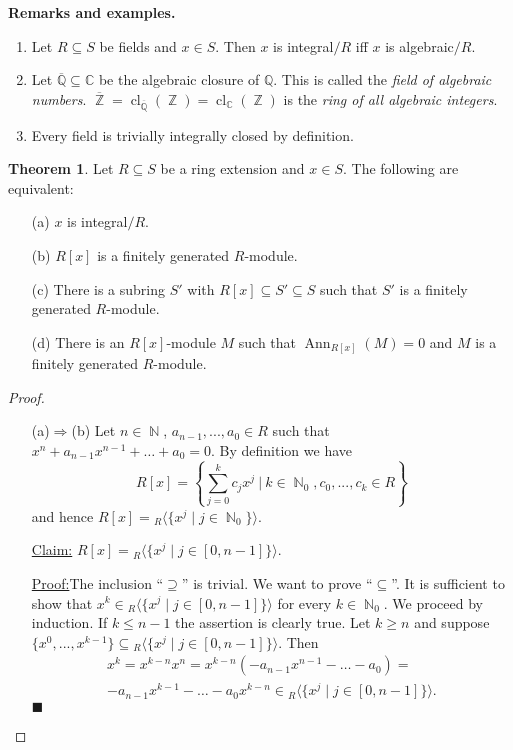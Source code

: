 \documentclass[12pt,a4paper]{report}
\theoremstyle{definition}
\newtheorem{theorem}{Theorem}[chapter] %
\theoremstyle{num.custom-title}
\newenvironment{claim}[1]{\par\noindent\underline{Claim#1:}\space}{} %
\newenvironment{claimproof}[1]{\par\noindent\underline{Proof:}\space#1}{\leavevmode\unskip\penalty9999 \hbox{}\nobreak\hfill\quad\hbox{$\blacksquare$}} %
\DeclareMathOperator{\Ann}{Ann}
\DeclareMathOperator{\N}{\mathbb{N}}
\DeclareMathOperator{\Z}{\mathbb{Z}}
\DeclareMathOperator{\imp}{\Rightarrow}
\DeclareMathOperator{\sse}{\subseteq}
\DeclareMathOperator{\cl}{cl}
\newcommand{\ol}{\overline}
\newcommand{\C}{\mathbb{C}}
\newcommand{\Q}{\mathbb{Q}}
\begin{document}
\noindent\textbf{Remarks and examples.}
\begin{enumerate}
\item Let $R \sse S$ be fields and $x \in S$. Then $x$ is integral$/R$ iff $x$ is algebraic$/R$.
\item Let $\ol{\Q} \sse \C$ be the algebraic closure of $\Q$. This is called the \emph{field of algebraic numbers}. $\ol{\Z}= \cl_{\ol{\Q}}(\Z)  = \cl_{\C}(\Z)$ is the \emph{ring of all algebraic integers}.
\item Every field is trivially integrally closed by definition.
\end{enumerate}

\begin{theorem}
Let $R \sse S$ be a ring extension and $x \in S$. The following are equivalent:
\begin{itemize}
\item[(a)] $x$ is integral$/R$.
\item[(b)] $R[x]$ is a finitely generated $R$-module.
\item[(c)] There is a subring $S'$ with $R[x] \sse S' \sse S$ such that $S'$ is a finitely generated $R$-module.
\item[(d)] There is an $R[x]$-module $M$ such that $\Ann_{R[x]}(M)=0$ and $M$ is a finitely generated $R$-module.
\end{itemize}
\begin{proof}\ 
\begin{itemize}
\item[(a)$\imp$(b)] Let $n \in \N$, $a_{n-1},...,a_0 \in R$ such that $x^n+a_{n-1}x^{n-1} + \ldots + a_0 = 0$. By definition we have
\[
R[x] = \left\{ \sum_{j=0}^k c_j x^j \ \Bigg| \ k \in \N_0, c_0,...,c_k \in R \right\}
\]
and hence $R[x] = {}_R \langle \{x^j \mid j \in \N_0 \} \rangle$.
\begin{claim}{} $R[x] = {}_R \langle \{x^j \mid j \in [0,n-1] \} \rangle$.
\begin{claimproof} The inclusion ``$\supseteq$'' is trivial. We want to prove ``$\sse$''. It is sufficient to show that $x^k \in {}_R \langle \{x^j \mid j \in [0,n-1] \} \rangle$ for every $k \in \N_0$. We proceed by induction. If $k \leq n-1$ the assertion is clearly true. Let $k \geq n$ and suppose $\{x^0,...,x^{k-1}\} \sse {}_R \langle \{x^j \mid j \in [0,n-1] \} \rangle$. Then
\begin{multline*}
x^k = x^{k-n}x^n = x^{k-n} \left( -a_{n-1}x^{n-1} - \ldots - a_0 \right) =\\
-a_{n-1}x^{k-1} - \ldots - a_0 x^{k-n} \in {}_R \langle \{x^j \mid j \in [0,n-1] \} \rangle.

\end{multline*}
\end{claimproof}
\end{claim}
\end{itemize}
\end{proof}
\end{theorem}
\end{document}
